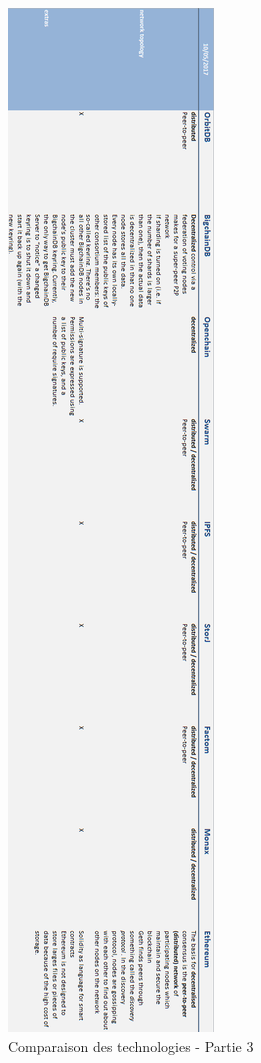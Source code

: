 \documentclass{tnreport}
\begin{document}
\begin{figure}[h]
	\centering
	\includegraphics[scale=0.5]{figures/blockchain-technologies-comparison-part3}
	\caption{Comparaison des technologies - Partie 3}
	\label{fig:comparison-part3}
\end{figure}
\end{document}
